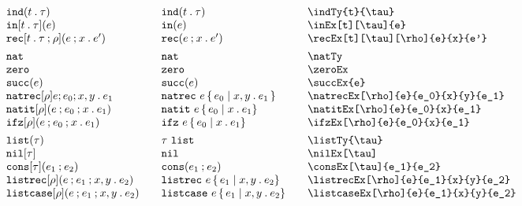\documentclass[11pt]{article}
\begin{document}
\begin{figure}

  \begin{small}
    \begin{displaymath}
      \begin{array}{l@{\qquad}l@{\qquad}l@{\qquad}l}
        \indTy{t}{\tau}                      & \indTy*{t}{\tau}                    & \verb|\indTy{t}{\tau}|                         \\
        \inEx[t][\tau]{e}                    & \inEx*{e}                           & \verb|\inEx[t][\tau]{e}|                       \\
        \recEx[t][\tau][\rho]{e}{x}{e'}      & \recEx*{e}{x}{e'}                   & \verb|\recEx[t][\tau][\rho]{e}{x}{e'}|         \\[1ex]

        \natTy                               & \natTy*                             & \verb|\natTy|                                  \\
        \zeroEx                              & \zeroEx*                            & \verb|\zeroEx|                                 \\
        \succEx{e}                           & \succEx*{e}                         & \verb|\succEx{e}|                              \\
        \natrecEx[\rho]{e}{e_0}{x}{y}{e_1}   & \natrecEx*[\rho]{e}{e_0}{x}{y}{e_1} & \verb|\natrecEx[\rho]{e}{e_0}{x}{y}{e_1}|      \\
        \natitEx[\rho]{e}{e_0}{x}{e_1}       & \natitEx*{e}{e_0}{x}{e_1}           & \verb|\natitEx[\rho]{e}{e_0}{x}{e_1}|          \\
        \ifzEx[\rho]{e}{e_0}{x}{e_1}         & \ifzEx*{e}{e_0}{x}{e_1}             & \verb|\ifzEx[\rho]{e}{e_0}{x}{e_1}|            \\[1ex]

        \listTy{\tau}                        & \listTy*{\tau}                      & \verb|\listTy{\tau}|                           \\
        \nilEx[\tau]                         & \nilEx*                             & \verb|\nilEx[\tau]|                            \\
        \consEx[\tau]{e_1}{e_2}              & \consEx*{e_1}{e_2}                  & \verb|\consEx[\tau]{e_1}{e_2}|                 \\
        \listrecEx[\rho]{e}{e_1}{x}{y}{e_2}  & \listrecEx*{e}{e_1}{x}{y}{e_2}      & \verb|\listrecEx[\rho]{e}{e_1}{x}{y}{e_2}|     \\
        \listcaseEx[\rho]{e}{e_1}{x}{y}{e_2} & \listcaseEx*{e}{e_1}{x}{y}{e_2}     & \verb|\listcaseEx[\rho]{e}{e_1}{x}{y}{e_2}|    \\[1ex]


\end{array}
\end{displaymath}
\end{small}
\end{figure}
\end{document}
